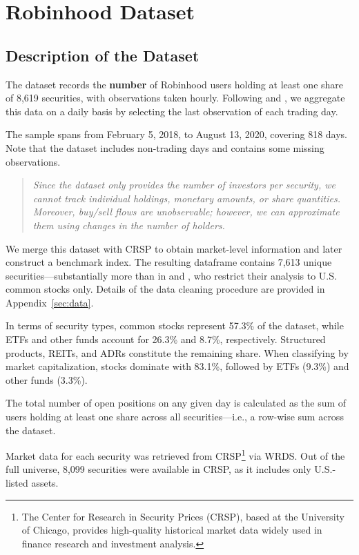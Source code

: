 \section{Robinhood Dataset}
\subsection{Description of the Dataset}
The dataset records the \textbf{number} of Robinhood users holding at least one share of 8,619 securities, with observations taken hourly. 
Following \cite{Welch2022} and \cite{Fedyk2024}, we aggregate this data on a daily basis by selecting the last observation of each trading day.

The sample spans from February 5, 2018, to August 13, 2020, covering 818 days. Note that the dataset includes non-trading days and contains some missing observations.

\begin{quote}
    \textit{
        Since the dataset only provides the number of investors per security, we cannot track individual holdings, monetary amounts, or share quantities. 
        Moreover, buy/sell flows are unobservable; however, we can approximate them using changes in the number of holders.
    }
\end{quote}

We merge this dataset with CRSP to obtain market-level information and later construct a benchmark index. 
The resulting dataframe contains 7,613 unique securities—substantially more than in \cite{Fedyk2024} and \cite{Welch2022}, who restrict their analysis to U.S. common stocks only. 
Details of the data cleaning procedure are provided in Appendix~\ref{sec:data}.

In terms of security types, common stocks represent 57.3\% of the dataset, while ETFs and other funds account for 26.3\% and 8.7\%, respectively. 
Structured products, REITs, and ADRs constitute the remaining share. 
When classifying by market capitalization, stocks dominate with 83.1\%, followed by ETFs (9.3\%) and other funds (3.3\%).

The total number of open positions on any given day is calculated as the sum of users holding at least one share across all securities—i.e., a row-wise sum across the dataset.

Market data for each security was retrieved from CRSP\footnote{The Center for Research in Security Prices (CRSP), based at the University of Chicago, provides high-quality historical market data widely used in finance research and investment analysis.} via WRDS. 
Out of the full universe, 8,099 securities were available in CRSP, as it includes only U.S.-listed assets. 


